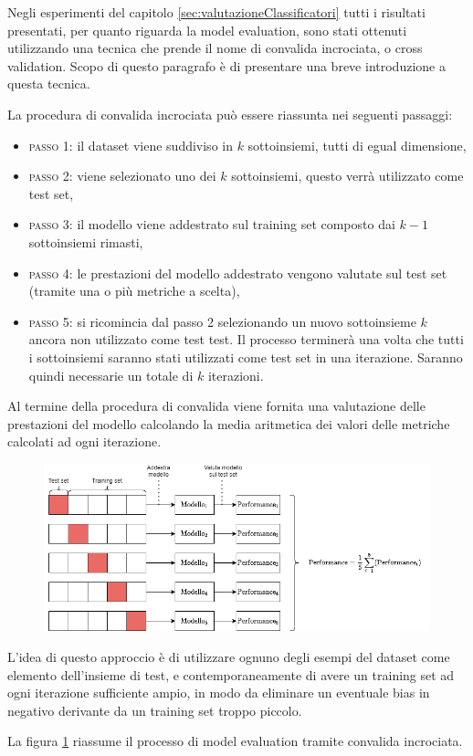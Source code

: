 \documentclass[../../main.tex]{subfiles}
\begin{document}
    Negli esperimenti del capitolo \ref{sec:valutazioneClassificatori} tutti i risultati presentati, per quanto riguarda la model evaluation, sono stati ottenuti utilizzando una tecnica che prende il nome di convalida incrociata, o cross validation. Scopo di questo paragrafo è di presentare una breve introduzione a questa tecnica.

    La procedura di convalida incrociata può essere riassunta nei seguenti passaggi: 
    \begin{itemize}
        \item \textsc{passo 1}: il dataset viene suddiviso in $k$ sottoinsiemi, tutti di egual dimensione,
        \item \textsc{passo 2}: viene selezionato uno dei $k$ sottoinsiemi, questo verrà utilizzato come test set,
        \item \textsc{passo 3}: il modello viene addestrato sul training set composto dai $k-1$ sottoinsiemi rimasti,
        \item \textsc{passo 4}: le prestazioni del modello addestrato vengono valutate sul test set (tramite una o più metriche a scelta),
        \item \textsc{passo 5}: si ricomincia dal passo 2 selezionando un nuovo sottoinsieme $k$ ancora non utilizzato come test test. Il processo terminerà una volta che tutti i sottoinsiemi saranno stati utilizzati come test set in una iterazione. Saranno quindi necessarie un totale di $k$ iterazioni.
    \end{itemize}

    Al termine della procedura di convalida viene fornita una valutazione delle prestazioni del modello calcolando la media aritmetica dei valori delle metriche calcolati ad ogni iterazione.

    \begin{figure}[H]
        \centering
        \includegraphics[width=\textwidth]{immagini/6_3/cross_validation.drawio.png}
        \caption{}
        \label{fig:crossvalidation}
    \end{figure}

    L'idea di questo approccio è di utilizzare ognuno degli esempi del dataset come elemento dell'insieme di test, e contemporaneamente di avere un training set ad ogni iterazione sufficiente ampio, in modo da eliminare un eventuale bias in negativo derivante da un training set troppo piccolo.

    La figura \ref{fig:crossvalidation} riassume il processo di model evaluation tramite convalida incrociata.
\end{document}
